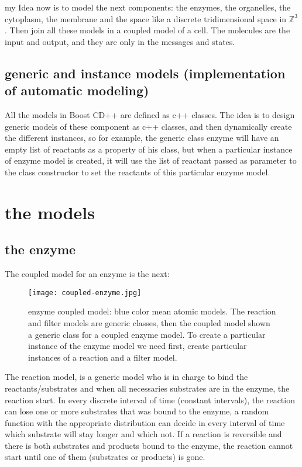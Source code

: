 \documentclass[12pt]{article}
\begin{document}
my Idea now is to model the next components: the enzymes, the organelles, the cytoplasm, the membrane and the space like a discrete tridimensional space in $\mathbb{Z}^3$. Then join all these models in a coupled model of a cell. The molecules are the input and output, and they are only in the messages and states.

\subsection*{generic and instance models (implementation of automatic modeling)}
All the models in Boost CD++ are defined as c++ classes. The idea is to design generic models of these component as c++ classes, and then dynamically create the different instances, so for example, the generic class enzyme will have an empty list of reactants as a property of his class, but when a particular instance of enzyme model is created, it will use the list of reactant passed as parameter to the class constructor to set the reactants of this particular enzyme model.

\newpage
\section*{the models}

\subsection*{the enzyme}
The coupled model for an enzyme is the next:

\begin{figure}[h!]
 \centering
  \texttt{[image: coupled-enzyme.jpg]}
 \caption{enzyme coupled model: blue color mean atomic models. The reaction and filter models are generic classes, then the coupled model shown a generic class for a coupled enzyme model. To create a particular instance of the enzyme model we need first, create particular instances of a reaction and a filter model.}
\end{figure}

The reaction model, is a generic model who is in charge to bind the reactants/substrates and when all necessaries substrates are in the enzyme, the reaction start.
In every discrete interval of time (constant intervals), the reaction can lose one or more substrates that was bound to the enzyme, a random function with the appropriate distribution can decide in every interval of time which substrate will stay longer and which not. If a reaction is reversible and there is both substrates and products bound to the enzyme, the reaction cannot start until one of them (substrates or products) is gone.
\end{document}
